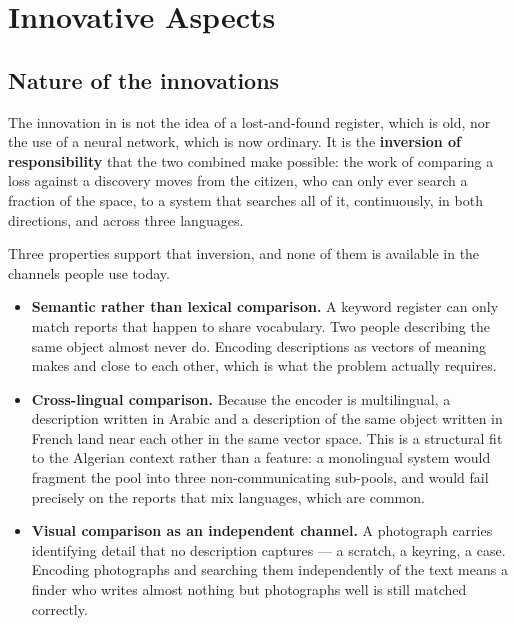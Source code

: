 \chapter{Innovative Aspects}
\label{ch:innovation}

\section{Nature of the innovations}

The innovation in \projectname{} is not the idea of a lost-and-found register,
which is old, nor the use of a neural network, which is now ordinary. It is the
\textbf{inversion of responsibility} that the two combined make possible: the
work of comparing a loss against a discovery moves from the citizen, who can
only ever search a fraction of the space, to a system that searches all of it,
continuously, in both directions, and across three languages.

Three properties support that inversion, and none of them is available in the
channels people use today.

\begin{itemize}[leftmargin=1.4em,itemsep=5pt]
  \item \textbf{Semantic rather than lexical comparison.} A keyword register can
        only match reports that happen to share vocabulary. Two people
        describing the same object almost never do. Encoding descriptions as
        vectors of meaning makes  and
         close to each other, which is what
        the problem actually requires.

  \item \textbf{Cross-lingual comparison.} Because the encoder is multilingual,
        a description written in Arabic and a description of the same object
        written in French land near each other in the same vector space. This is
        a structural fit to the Algerian context rather than a feature: a
        monolingual system would fragment the pool into three
        non-communicating sub-pools, and would fail precisely on the reports
        that mix languages, which are common.

  \item \textbf{Visual comparison as an independent channel.} A photograph
        carries identifying detail that no description captures --- a scratch, a
        keyring, a case. Encoding photographs and searching them independently
        of the text means a finder who writes almost nothing but photographs
        well is still matched correctly.
\end{itemize}

